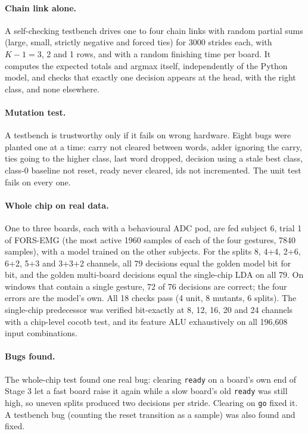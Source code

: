 \documentclass[11pt,a4paper]{article}
\begin{document}
\paragraph{Chain link alone.} A self-checking testbench drives one to four chain links with random partial sums
(large, small, strictly negative and forced ties) for 3000 strides each, with $K-1=3$, 2 and 1 rows, and with a
random finishing time per board. It computes the expected totals and argmax itself, independently of the Python
model, and checks that exactly one decision appears at the head, with the right class, and none elsewhere.

\paragraph{Mutation test.} A testbench is trustworthy only if it fails on wrong hardware. Eight bugs were planted
one at a time: carry not cleared between words, adder ignoring the carry, ties going to the higher class, last
word dropped, decision using a stale best class, class-0 baseline not reset, ready never cleared, ids not
incremented. The unit test fails on every one.

\paragraph{Whole chip on real data.} One to three boards, each with a behavioural ADC pod, are fed subject 6,
trial 1 of FORS-EMG (the most active 1960 samples of each of the four gestures, 7840 samples), with a model
trained on the other subjects. For the splits 8, 4+4, 2+6, 6+2, 5+3 and 3+3+2 channels, all 79 decisions equal
the golden model bit for bit, and the golden multi-board decisions equal the single-chip LDA on all 79.
On windows that contain a single gesture, 72 of 76 decisions are correct; the four errors are the model's own.
All 18 checks pass (4 unit, 8 mutants, 6 splits). The single-chip predecessor was verified bit-exactly at 8, 12,
16, 20 and 24 channels with a chip-level cocotb test, and its feature ALU exhaustively on all 196{,}608 input
combinations.

\paragraph{Bugs found.} The whole-chip test found one real bug: clearing \texttt{ready} on a board's own end of
Stage 3 let a fast board raise it again while a slow board's old \texttt{ready} was still high, so uneven splits
produced two decisions per stride. Clearing on \texttt{go} fixed it. A testbench bug (counting the reset
transition as a sample) was also found and fixed.
\end{document}
